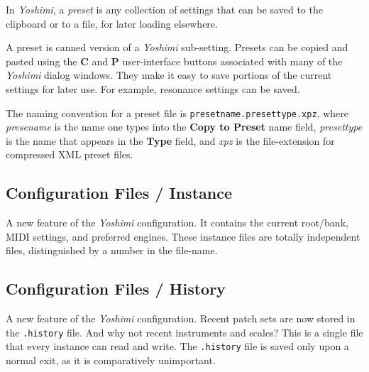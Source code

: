    In \textsl{Yoshimi}, a
   \textsl{preset} is any collection of settings that can be saved to the
   clipboard or to a file, for later loading elsewhere.

   A preset is canned version of a \textsl{Yoshimi} sub-setting.  Presets can be
   copied and pasted using the \textbf{C} and \textbf{P} user-interface buttons
   associated with many of the \textsl{Yoshimi} dialog windows.  They make it
   easy to save portions of the current settings for later use.  For example,
   resonance settings can be saved.

   The naming convention for a preset file is
   \texttt{presetname.presettype.xpz}, where
   \textsl{presename} is the name one types into the \textbf{Copy to Preset}
   name field, \textsl{presettype} is the name that appears in the
   \textbf{Type} field, and \textsl{xpz} is the file-extension for compressed
   XML preset files.


\subsection{Configuration Files / Instance}
\label{subsec:configuration_instance}

   A new feature of the \textsl{Yoshimi} configuration.
   It contains the current root/bank, MIDI settings, and preferred engines.
   These instance files are totally independent files, distinguished by a number
   in the file-name.

\subsection{Configuration Files / History}
\label{subsec:configuration_history}

   A new feature of the \textsl{Yoshimi} configuration.
   Recent patch sets are now stored in the \texttt{.history} file.
   And why not recent instruments and scales?
   This is a single file that every instance can read and write.
   The \texttt{.history} file is saved only upon a normal exit, as it is
   comparatively unimportant.

